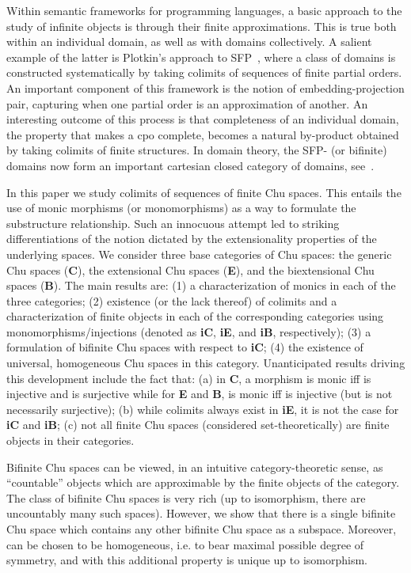 \documentclass{LMCS}
\begin{document}
\noindent Within semantic frameworks for programming languages, a
basic approach to the study of infinite objects is through their
finite approximations. This is true both within an individual domain,
as well as with domains collectively. A salient example of the latter
is Plotkin's approach to SFP~\cite{plotkin}, where a class of domains
is constructed systematically by taking colimits of sequences of
finite partial orders.  An important component of this framework is
the notion of embedding-projection pair, capturing when one partial
order is an approximation of another.  An interesting outcome of this
process is that completeness of an individual domain, the property
that makes a cpo complete, becomes a natural by-product obtained by
taking colimits of finite structures.  In domain theory, the SFP- (or
bifinite) domains now form an important cartesian closed category of
domains, see~\cite{curien}.

In this paper we study colimits of sequences of finite Chu spaces.
This entails the use of monic morphisms (or monomorphisms) as a way to
formulate the substructure relationship.  Such an innocuous attempt
led to striking differentiations of the notion dictated by the
extensionality properties of the underlying spaces. We consider three
base categories of Chu spaces: the generic Chu spaces ({\bf C}), the
extensional Chu spaces ({\bf E}), and the biextensional Chu spaces
({\bf B}).  The main results are: (1) a characterization of monics in
each of the three categories; (2) existence (or the lack thereof) of
colimits and a characterization of finite objects in each of the
corresponding categories using monomorphisms/injections (denoted as
{\bf iC}, {\bf iE}, and {\bf iB}, respectively); (3) a formulation of
bifinite Chu spaces with respect to {\bf iC}; (4) the existence of
universal, homogeneous Chu spaces in this category.  Unanticipated
results driving this development include the fact that: (a) in {\bf
  C}, a morphism  is monic iff  is injective and  is
surjective while for {\bf E} and {\bf B},  is monic iff  is
injective (but  is not necessarily surjective); (b) while colimits
always exist in {\bf iE}, it is not the case for {\bf iC} and {\bf
  iB}; (c) not all finite Chu spaces (considered set-theoretically)
are finite objects in their categories.

Bifinite Chu spaces can be viewed, in an intuitive category-theoretic
sense, as ``countable'' objects which are approximable by the finite
objects of the category. The class of bifinite Chu spaces is very rich
(up to isomorphism, there are uncountably many such spaces). However,
we show that there is a single bifinite Chu space  which contains
any other bifinite Chu space as a subspace. Moreover,  can be
chosen to be homogeneous, i.e. to bear maximal possible degree of
symmetry, and with this additional property  is unique up to
isomorphism.
\end{document}
